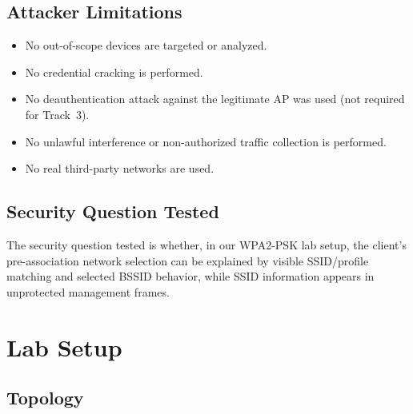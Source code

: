 \documentclass[12pt,a4paper]{article}
\begin{document}
\subsection{Attacker Limitations}

\begin{itemize}
    \item No out-of-scope devices are targeted or analyzed.
    \item No credential cracking is performed.
    \item No deauthentication attack against the legitimate AP was used (not required for Track~3).
    \item No unlawful interference or non-authorized traffic collection is performed.
    \item No real third-party networks are used.
\end{itemize}

\subsection{Security Question Tested}

The security question tested is whether, in our WPA2-PSK lab setup, the client's pre-association network selection can be explained by visible SSID/profile matching and selected BSSID behavior, while SSID information appears in unprotected management frames.

\section{Lab Setup}

\subsection{Topology}
\end{document}
